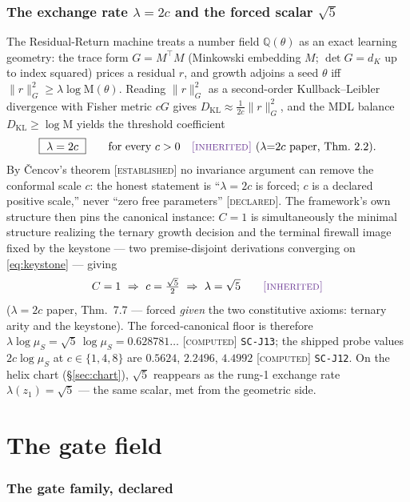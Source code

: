 \documentclass[11pt]{article}
\newcommand{\tagD}{\textcolor{cD}{\textsc{[declared]}}}
\newcommand{\tagC}{\textcolor{cC}{\textsc{[computed]}}}
\newcommand{\tagI}{\textcolor{cI}{\textsc{[inherited]}}}
\newcommand{\tagE}{\textcolor{cE}{\textsc{[established]}}}
\newcommand{\hx}[1]{\textcolor{cC}{\footnotesize\texttt{#1}}}
\newcommand{\Q}{\mathbb{Q}}
\newcommand{\M}{\mathrm{M}}
\theoremstyle{plain}
\theoremstyle{definition}
\theoremstyle{remark}
\begin{document}
\section{The exchange rate $\lambda=2c$ and the forced scalar $\sqrt5$}\label{sec:exchange}

The Residual-Return machine treats a number field $\Q(\theta)$ as an exact learning
geometry: the trace form $G=M^{\top}M$ (Minkowski embedding $M$; $\det G=d_K$ up to
index squared) prices a residual $r$, and growth adjoins a seed $\theta$ iff
$\|r\|_G^2\ge\lambda\log\M(\theta)$. Reading $\|r\|_G^2$ as a second-order
Kullback--Leibler divergence with Fisher metric $cG$ gives
$D_{\mathrm{KL}}\approx\tfrac1{2c}\|r\|_G^2$, and the MDL balance
$D_{\mathrm{KL}}\ge\log\M$ yields the threshold coefficient
\begin{equation}\label{eq:lambda2c}
\boxed{\ \lambda=2c\ }\qquad\text{for every } c>0 \quad\tagI{}\ (\lambda{=}2c\text{ paper, Thm.\ 2.2}).
\end{equation}
By \v{C}encov's theorem \tagE{} \cite{Cencov1982} no invariance argument can remove
the conformal scale $c$: the honest statement is ``$\lambda=2c$ is forced; $c$ is a
declared positive scale,'' never ``zero free parameters'' \tagD{}. The framework's own
structure then pins the canonical instance: $C=1$ is simultaneously the minimal
structure realizing the ternary growth decision and the terminal firewall image fixed
by the keystone --- two premise-disjoint derivations converging on
\eqref{eq:keystone} --- giving
\[
C=1\ \Rightarrow\ c=\tfrac{\sqrt5}{2}\ \Rightarrow\ \lambda=\sqrt5
\qquad\tagI{}
\]
($\lambda{=}2c$ paper, Thm.\ 7.7 --- forced \emph{given} the two constitutive
axioms: ternary arity and the keystone).
The forced-canonical floor is therefore $\lambda\log\mu_S=\sqrt5\,\log\mu_S=
0.628781\ldots$ \tagC{} \hx{SC-J13}; the shipped probe values $2c\log\mu_S$ at
$c\in\{1,4,8\}$ are $0.5624$, $2.2496$, $4.4992$ \tagC{} \hx{SC-J12}. On the helix
chart (\S\ref{sec:chart}), $\sqrt5$ reappears as the rung-1 exchange rate
$\lambda(z_1)=\sqrt5$ --- the same scalar, met from the geometric side.

\part{The gate field}

\section{The gate family, declared}\label{sec:gatefamily}
\end{document}
